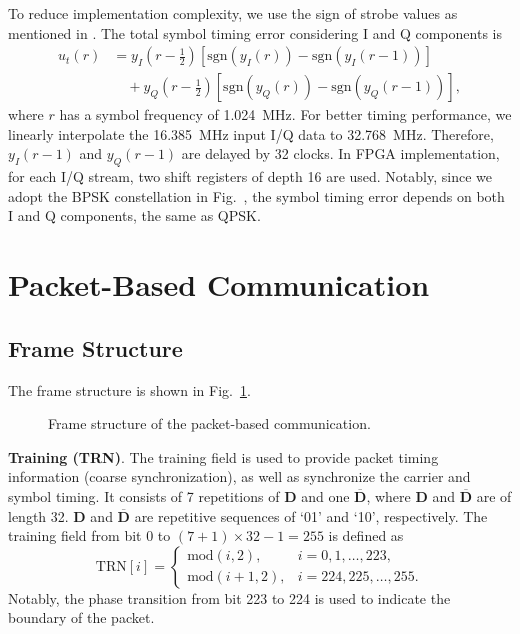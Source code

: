 \documentclass[journal,twoside]{IEEEtran}
\begin{document}
      To reduce implementation complexity, we use the sign of strobe values as mentioned in \cite{gardner1986bpsk}.
      The total symbol timing error considering I and Q components is
      \begin{equation}
        \begin{aligned}
          u_t(r)&=y_I(r-\tfrac12)\left[\mathrm{sgn}\left(y_I(r)\right)-\mathrm{sgn}\left(y_I(r-1)\right)\right] \\
          &\quad{}+y_Q(r-\tfrac12)\left[\mathrm{sgn}\left(y_Q(r)\right)-\mathrm{sgn}\left(y_Q(r-1)\right)\right],
        \end{aligned}
      \end{equation}
      where $r$ has a symbol frequency of \qty{1.024}{MHz}.
      For better timing performance, we linearly interpolate the \qty{16.385}{MHz} input I/Q data to \qty{32.768}{MHz}.
      Therefore, $y_I(r-1)$ and $y_Q(r-1)$ are delayed by 32 clocks.
      In FPGA implementation, for each I/Q stream, two shift registers of depth 16 are used.
      Notably, since we adopt the BPSK constellation in Fig.~,
      the symbol timing error depends on both I and Q components, the same as QPSK.

  \section{Packet-Based Communication}

    \subsection{Frame Structure}

      The frame structure is shown in Fig.~\ref{fig:frame_structure}.
      \begin{figure}[htbp]
        \centering
        
        \caption{Frame structure of the packet-based communication.}
        \label{fig:frame_structure}
      \end{figure}

    \textbf{Training (TRN)}.
    The training field is used to provide packet timing information (coarse synchronization),
    as well as synchronize the carrier and symbol timing.
    It consists of 7 repetitions of $\mathbf{D}$ and one $\overline{\mathbf{D}}$,
    where $\mathbf{D}$ and $\overline{\mathbf{D}}$ are of length 32.
    $\mathbf{D}$ and $\overline{\mathbf{D}}$ are repetitive sequences of `01' and `10', respectively.
    The training field from bit $0$ to $(7+1)\times32-1=255$ is defined as
    \begin{equation}
      \mathrm{TRN}[i]=\begin{cases}
        \mathrm{mod}(i,2), & i=0,1,\dots,223,\\
        \mathrm{mod}(i+1,2), & i=224,225,\dots,255.
      \end{cases}
    \end{equation}
    Notably, the phase transition from bit 223 to 224 is used to indicate the boundary of the packet.
\end{document}
